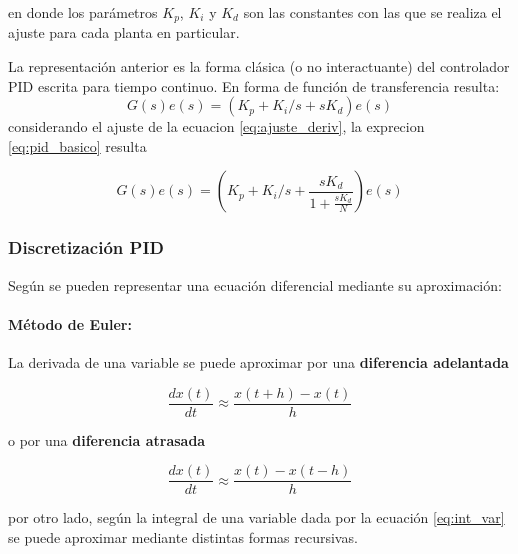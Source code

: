 \documentclass[10pt,conference,a4paper,onecolumn]{article}%
\begin{document}
en donde los parámetros $K_p$, $K_i$ y $K_d$ son las constantes con las que se realiza el ajuste para cada planta en particular. 

La representación anterior es la forma clásica (o no interactuante) del controlador PID escrita para tiempo continuo. En forma de función de transferencia resulta:
\begin{equation}
G(s)e(s)=\left(K_p + K_i/s + sK_d \right)e(s)
\label{eq:pid_basico}
\end{equation}
considerando el ajuste de la ecuacion \ref{eq:ajuste_deriv}, la exprecion \ref{eq:pid_basico} resulta

\begin{equation}
G(s)e(s)=\left( K_p + K_i/s + \frac{sK_d}{1+\frac{sK_d}{N} } \right)e(s)
\label{eq:pid_final}
\end{equation}



 
 \subsubsection{Discretización PID}
% 
 
 Según \cite[pág. 214]{astrom} se pueden representar una ecuación diferencial mediante su aproximación:
 
 \paragraph{Método de Euler:} La derivada de una variable se puede aproximar por una \textbf{diferencia adelantada}
 
 \begin{equation}
 \frac{dx(t)}{dt}\approx \frac{x(t+h)-x(t)}{h}
 \end{equation}
  
  o por  una \textbf{diferencia atrasada}
  
   \begin{equation}
 \frac{dx(t)}{dt}\approx \frac{x(t)-x(t-h)}{h}
 \end{equation}
  
  por otro lado, según \cite[pág. 46 ]{biblia_PID} la integral de una variable dada por la ecuación \ref{eq:int_var} se puede aproximar mediante  distintas formas recursivas.
  
\end{document}
